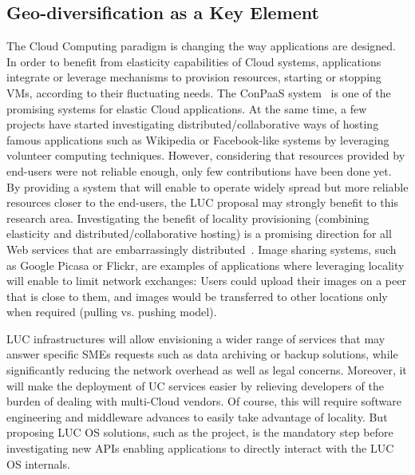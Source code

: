 \subsection{Geo-diversification as a Key Element}
The Cloud Computing paradigm is changing the way applications are designed.  In
order to benefit from elasticity capabilities of Cloud systems, applications
integrate or leverage mechanisms to provision resources, \ie starting or
stopping VMs, according to their fluctuating needs.
The ConPaaS system~\cite{pierre:2012} is one of the promising systems for elastic Cloud
applications. At the same time, a few projects have started investigating
distributed/collaborative ways of hosting famous applications such as Wikipedia
or Facebook-like  systems by leveraging volunteer computing techniques. 
However, considering that resources provided by end-users were not reliable enough, only few contributions 
have been done yet. 
%
By providing a system that will enable to operate widely spread but more
reliable resources closer to the end-users, the LUC proposal may strongly
benefit to this research area.
Investigating the benefit of locality provisioning (\ie combining elasticity and distributed/collaborative
hosting) is a promising direction for all Web services that are embarrassingly distributed~\cite{church:2008}.
Image sharing systems, such as Google Picasa  or Flickr,  are
examples of applications where leveraging locality will enable to limit network exchanges:
Users could upload their images on a peer that is close to them, and images would be
transferred to other locations only when required (pulling vs. pushing
model).

LUC infrastructures will allow envisioning a wider range of services that may
answer specific SMEs requests such as data archiving or backup solutions, while
significantly reducing the network overhead as well as legal concerns. Moreover, 
it will make the deployment of UC services easier by relieving developers of the burden of dealing with
multi-Cloud vendors.
Of course, this will require software engineering and
middleware advances to easily take advantage of locality. But proposing LUC OS
solutions, such as the  \discovery project, is the mandatory step before
investigating new APIs enabling applications to directly interact with the LUC OS internals. 
%
%
